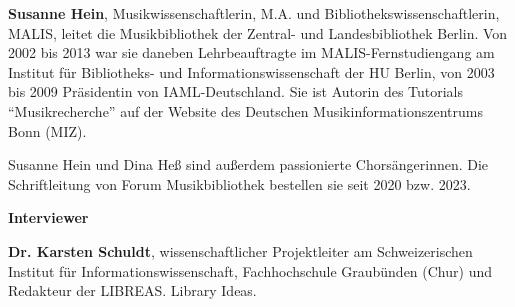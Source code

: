 \documentclass[a4paper,
fontsize=11pt,
oneside,
numbers=noperiodatend,
parskip=half-,
bibliography=totoc,
final
]{scrartcl}
\begin{document}
\textbf{Susanne Hein}, Musikwissenschaftlerin, M.A. und Bibliothekswissenschaftlerin, MALIS, 
leitet die Musikbibliothek der Zentral- und Landesbibliothek Berlin. Von 2002 bis 2013 
war sie daneben Lehrbeauftragte im MALIS-Fernstudiengang am Institut für Bibliotheks- und Informationswissenschaft
der HU Berlin, von 2003 bis 2009 Präsidentin von IAML-Deutschland. Sie ist Autorin des Tutorials 
\enquote{Musikrecherche} auf der Website des Deutschen Musikinformationszentrums Bonn (MIZ).

Susanne Hein und Dina Heß sind außerdem passionierte Chorsängerinnen. Die Schriftleitung von Forum 
Musikbibliothek bestellen sie seit 2020 bzw. 2023.

\textbf{Interviewer}

\textbf{Dr. Karsten Schuldt}, wissenschaftlicher Projektleiter am Schweizerischen Institut für Informationswissenschaft,
Fachhochschule Graubünden (Chur) und Redakteur der LIBREAS. Library Ideas.
\end{document}
